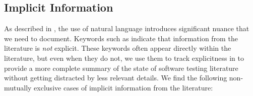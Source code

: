 

\subsection{Implicit Information}\label{imp-info}

As described in , the use of natural language introduces
significant nuance that we need to document. Keywords such as \impKeywords{}
indicate that information from the literature is \emph{not} explicit. These
keywords often appear directly within the literature, but even when they do
not, we use them to track explicitness in \ourApproachGlossary{} to
provide a more complete summary of the state of software testing literature
without getting distracted by less relevant details. We find the following
non-mutually exclusive cases of implicit information from the literature:

